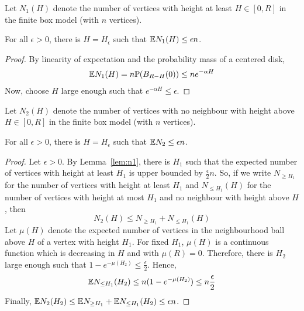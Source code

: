 \begin{lemma}\label{lem:n1}
Let $N_1(H)$ denote the number of vertices with height at least $H \in [0,R]$ in the finite box model (with $n$ vertices).

For all $\epsilon >0$, there is $H=H_\epsilon$ such that $\mathbb{E} N_1(H) \leq \epsilon n$.
\end{lemma}
\begin{proof}
By linearity of expectation and the probability mass of a centered disk,
\begin{align*}
\mathbb{E} N_1(H) = n \mathbb{P}(B_{R-H}(0)) \leq n e^{-\alpha H}
\end{align*}
Now, choose $H$ large enough such that $e^{-\alpha H} \leq \epsilon$.
\end{proof}
\begin{lemma}
Let $N_2(H)$ denote the number of vertices with no neighbour with height above $H \in [0,R]$ in the finite box model (with $n$ vertices).

For all $\epsilon >0$, there is $H=H_\epsilon$ such that $\mathbb{E} N_2 \leq \epsilon n$.
\end{lemma}
\begin{proof}
Let $\epsilon >0$. By Lemma~\ref{lem:n1}, there is $H_1$ such that the expected number of vertices with height at least $H_1$ is upper bounded by $\frac{\epsilon}{2}n$. So, if we write $N_{\geq H_1}$ for the number of vertices with height at least $H_1$ and $N_{\leq H_1}(H)$ for the number of vertices with height at most $H_1$ and no neighbour with height above $H$, then 
$$N_2(H) \leq N_{\geq H_1} + N_{\leq H_1}(H)$$
Let $\mu(H)$ denote the expected number of vertices in the neighbourhood ball above $H$ of a vertex with height $H_1$. For fixed $H_1$, $\mu(H)$ is a continuous function which is decreasing in $H$ and with $\mu(R)=0$. Therefore, there is $H_2$ large enough such that $1-e^{-\mu(H_2)} \leq \frac{\epsilon}{2}$. Hence,
$$\mathbb{E} N_{\leq H_1}(H_2) \leq n (1-e^{-\mu(H_2)}) \leq n \frac{\epsilon}{2}$$
Finally, $\mathbb{E} N_2(H_2) \leq \mathbb{E} N_{\geq H_1} + \mathbb{E} N_{\leq H_1}(H_2) \leq \epsilon n$.
\end{proof}

